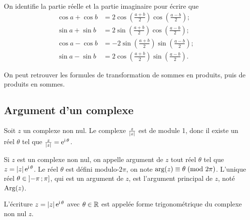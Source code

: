                       On identifie la partie réelle et la partie imaginaire pour écrire que
                      \begin{align}
                        \cos a + \cos b &= 2 \cos \left( \frac{a + b}{2} \right) \cos 
                        \left(\frac{a-b}{2} \right);\\
                        \sin a + \sin b &= 2 \sin \left( \frac{a + b}{2} \right) \cos 
                        \left(\frac{a-b}{2} \right);\\
                        \cos a - \cos b &= -2 \sin \left( \frac{a + b}{2} \right) \sin 
                        \left(\frac{a-b}{2} \right);\\
                        \sin a - \sin b &= 2 \cos \left( \frac{a + b}{2} \right) \sin 
                        \left(\frac{a-b}{2} \right).
                      \end{align}

                      On peut retrouver les formules de transformation de sommes en produits, puis de 
                      produits en sommes.

                      \subsection{Argument d'un complexe}
                      \label{subsec:argumentcomplexe}

                      Soit \(z\) un complexe non nul. Le complexe \(\frac{z}{\left\lvert z\right\rvert}\) est de module 
                      1, donc il existe un réel \(\theta\) tel que 
                      \(\frac{z}{\left\lvert z\right\rvert} = \operatorname{e}^{\operatorname{i} \theta}\).

                      \begin{defdef}
                        Si \(z\) est un complexe non nul, on appelle argument de \(z\) tout réel 
                        \(\theta\) tel que \(z = \left\lvert z\right\rvert \operatorname{e}^{\operatorname{i} \theta}\).  Le réel \(\theta\) est 
                        défini modulo-\(2\pi\), on note \(\arg(z) \equiv \theta\!\pmod {2\pi}\). L'unique 
                        réel \(\theta \in \left] -\pi \, ;  \pi \right]\), qui est un argument de \(z\), 
                        est l'argument principal de \(z\), noté \(\operatorname{Arg}(z)\).
                      \end{defdef}

                      L'écriture \(z = \left\lvert z\right\rvert \operatorname{e}^{\operatorname{i} \theta}\) avec \(\theta \in \mathbb{R}\) est appelée 
                      forme trigonométrique du complexe non nul \(z\).

